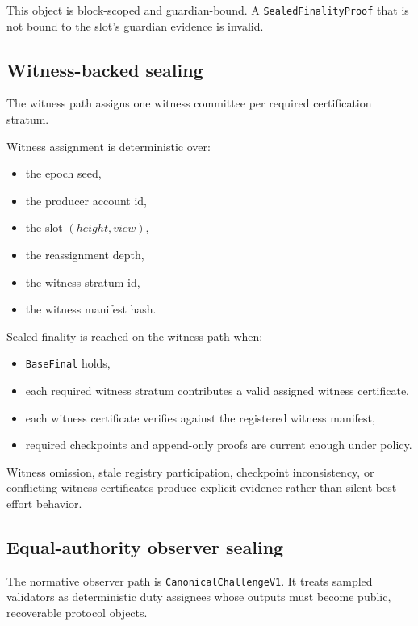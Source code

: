\documentclass[11pt]{article}
\newcommand{\code}[1]{\texttt{#1}}
\begin{document}
This object is block-scoped and guardian-bound. A \code{SealedFinalityProof}
that is not bound to the slot's guardian evidence is invalid.

\subsection{Witness-backed sealing}

The witness path assigns one witness committee per required certification
stratum.

Witness assignment is deterministic over:

\begin{itemize}[leftmargin=1.5em]
\item the epoch seed,
\item the producer account id,
\item the slot \((height, view)\),
\item the reassignment depth,
\item the witness stratum id,
\item the witness manifest hash.
\end{itemize}

Sealed finality is reached on the witness path when:

\begin{itemize}[leftmargin=1.5em]
\item \code{BaseFinal} holds,
\item each required witness stratum contributes a valid assigned witness
certificate,
\item each witness certificate verifies against the registered witness manifest,
\item required checkpoints and append-only proofs are current enough under
policy.
\end{itemize}

Witness omission, stale registry participation, checkpoint inconsistency, or
conflicting witness certificates produce explicit evidence rather than silent
best-effort behavior.

\subsection{Equal-authority observer sealing}

The normative observer path is \code{CanonicalChallengeV1}. It treats sampled
validators as deterministic duty assignees whose outputs must become public,
recoverable protocol objects.
\end{document}
